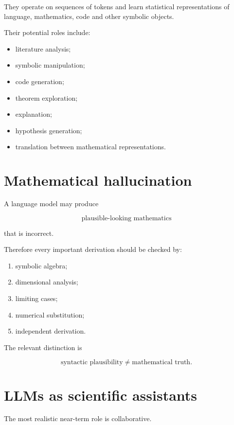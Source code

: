\documentclass[11pt,a4paper,oneside]{book}
\begin{document}
They operate on sequences of tokens and learn statistical representations of
language, mathematics, code and other symbolic objects.

Their potential roles include:

\begin{itemize}
\item literature analysis;
\item symbolic manipulation;
\item code generation;
\item theorem exploration;
\item explanation;
\item hypothesis generation;
\item translation between mathematical representations.
\end{itemize}

\section{Mathematical hallucination}

A language model may produce

\begin{equation}
\text{plausible-looking mathematics}
\end{equation}

that is incorrect.

Therefore every important derivation should be checked by:

\begin{enumerate}
\item symbolic algebra;
\item dimensional analysis;
\item limiting cases;
\item numerical substitution;
\item independent derivation.
\end{enumerate}

The relevant distinction is

\begin{equation}
\boxed{
\text{syntactic plausibility}
\neq
\text{mathematical truth}.
}
\end{equation}

\section{LLMs as scientific assistants}

The most realistic near-term role is collaborative.
\end{document}
